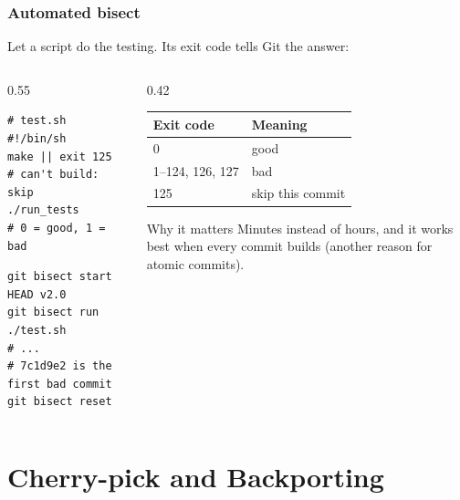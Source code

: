 \documentclass[aspectratio=169,10pt,compress]{beamer}
\begin{document}
\begin{frame}[t,fragile] \frametitle{Automated bisect}
  Let a script do the testing. Its exit code tells Git the answer:

  \begin{columns}[T]
    \begin{column}{0.55\textwidth}
\begin{lstlisting}
# test.sh
#!/bin/sh
make || exit 125     # can't build: skip
./run_tests          # 0 = good, 1 = bad
\end{lstlisting}
\begin{lstlisting}
git bisect start HEAD v2.0
git bisect run ./test.sh
# ...
# 7c1d9e2 is the first bad commit
git bisect reset
\end{lstlisting}
    \end{column}
    \begin{column}{0.42\textwidth}
      \small
      \begin{tabular}{@{}ll@{}}
        \toprule
        \textbf{Exit code} & \textbf{Meaning} \\
        \midrule
        0 & good \\
        1--124, 126, 127 & bad \\
        125 & skip this commit \\
        \bottomrule
      \end{tabular}

      \vspace{1em}
      \begin{block}{Why it matters}
        Minutes instead of hours, and it works best when every commit builds
        (another reason for atomic commits).
      \end{block}
    \end{column}
  \end{columns}
\end{frame}

\section[Backport]{Cherry-pick and Backporting}
\end{document}
